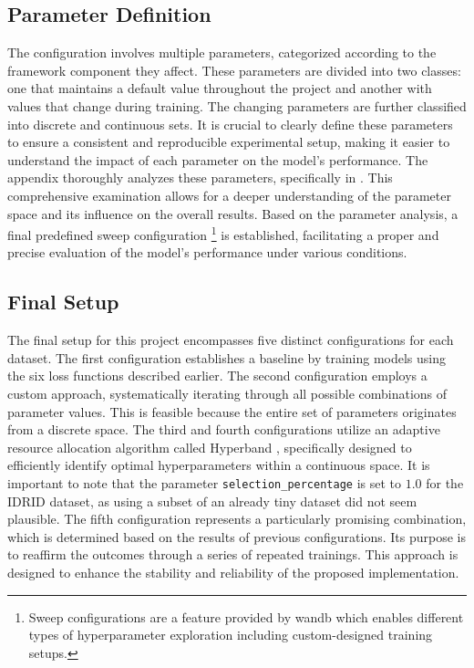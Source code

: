\subsection{Parameter Definition}
The configuration involves multiple parameters, categorized according to the framework component they affect. These parameters are divided into two classes: one that maintains a default value throughout the project and another with values that change during training. The changing parameters are further classified into discrete and continuous sets. It is crucial to clearly define these parameters to ensure a consistent and reproducible experimental setup, making it easier to understand the impact of each parameter on the model's performance. The appendix thoroughly analyzes these parameters, specifically in . This comprehensive examination allows for a deeper understanding of the parameter space and its influence on the overall results. Based on the parameter analysis, a final predefined sweep configuration \footnote{Sweep configurations are a feature provided by \ac{wandb} which enables different types of hyperparameter exploration including custom-designed training setups.} is established, facilitating a proper and precise evaluation of the model's performance under various conditions.

\subsection{Final Setup}
The final setup for this project encompasses five distinct configurations for each dataset. The first configuration establishes a baseline by training models using the six loss functions described earlier. The second configuration employs a custom approach, systematically iterating through all possible combinations of parameter values. This is feasible because the entire set of parameters originates from a discrete space. The third and fourth configurations utilize an adaptive resource allocation algorithm called Hyperband \cite{DBLP:journals/corr/LiJDRT16}, specifically designed to efficiently identify optimal hyperparameters within a continuous space. It is important to note that the parameter \texttt{selection\_percentage} is set to $1.0$ for the \ac{IDRID} dataset, as using a subset of an already tiny dataset did not seem plausible. The fifth configuration represents a particularly promising combination, which is determined based on the results of previous configurations. Its purpose is to reaffirm the outcomes through a series of repeated trainings. This approach is designed to enhance the stability and reliability of the proposed implementation.


